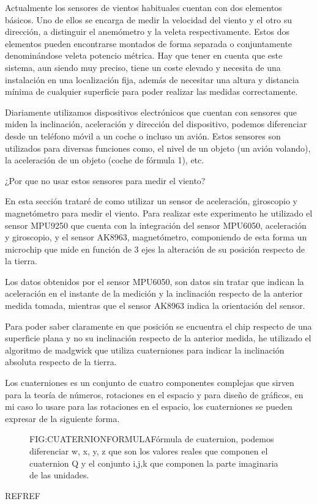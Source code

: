 
 Actualmente los sensores de vientos habituales cuentan con dos elementos básicos. Uno de ellos se encarga de medir la velocidad del viento y el otro su dirección, a distinguir el anemómetro y la veleta respectivamente. Estos dos elementos pueden encontrarse montados de forma separada o conjuntamente denominándose veleta potencio métrica.
 Hay que tener en cuenta que este sistema, aun siendo muy preciso, tiene un coste elevado y necesita de una instalación en una localización fija, además de necesitar una altura y distancia mínima de cualquier superficie para poder realizar las medidas correctamente.
 
 Diariamente utilizamos dispositivos electrónicos que cuentan con sensores que miden la inclinación, aceleración y dirección del dispositivo, podemos diferenciar desde un teléfono móvil a un coche o incluso un avión.
 Estos sensores son utilizados para diversas funciones como, el nivel de un objeto (un avión volando), la aceleración de un objeto (coche de fórmula 1), etc.
 
 ¿Por que no usar estos sensores para medir el viento?
 
 En esta sección trataré de como utilizar un sensor de aceleración, giroscopio y magnetómetro para medir el viento.
 Para realizar este experimento he utilizado el sensor MPU9250 que cuenta con la integración del sensor MPU6050, aceleración y giroscopio, y el sensor AK8963, magnetómetro, componiendo de esta forma un microchip que mide en función de 3 ejes la alteración de su posición respecto de la tierra.
 
 Los datos obtenidos por el sensor MPU6050, son datos sin tratar que indican la aceleración en el instante de la medición y la inclinación respecto de la anterior medida tomada, mientras que el sensor AK8963 indica la orientación del sensor.
 
 Para poder saber claramente en que posición se encuentra el chip respecto de una superficie plana y no su inclinación respecto de la anterior medida, he utilizado el algoritmo de madgwick que utiliza cuaterniones para indicar la inclinación absoluta respecto de la tierra. 
 
 Los cuaterniones es un conjunto de cuatro componentes complejas que sirven para la teoría de números, rotaciones en el espacio y para diseño de gráficos, en mi caso lo usare para las rotaciones en el espacio, los cuaterniones se pueden expresar de la siguiente forma.
 
\begin{figure}[Cuaternion formula]{FIG:CUATERNIONFORMULA}{Fórmula de cuaternion, podemos diferenciar w, x, y, z que son los valores reales que componen el cuaternion Q y el conjunto i,j,k que componen la parte imaginaria de las unidades. }
\end{figure}
REFREF

